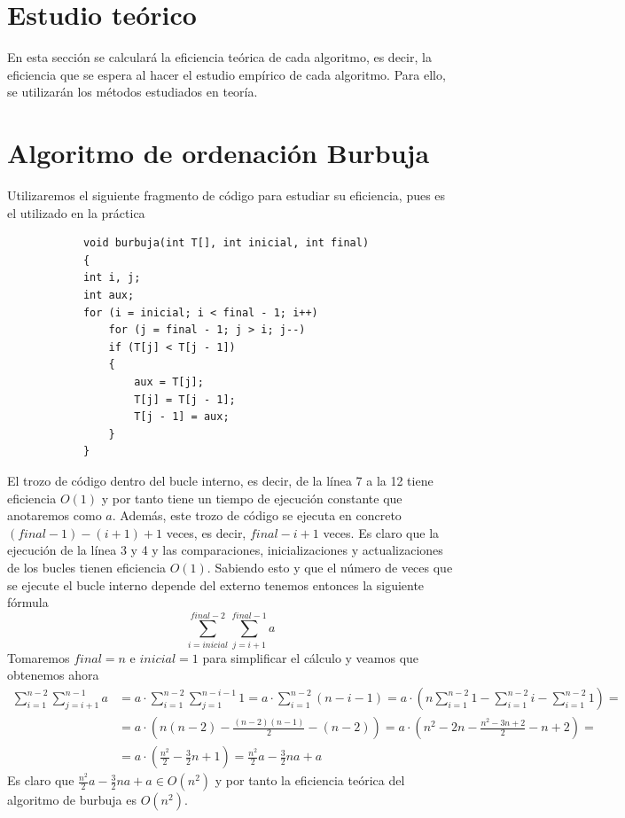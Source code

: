 \documentclass[11pt,openany]{book}
\begin{document}
\section{Estudio teórico}
En esta sección se calculará la eficiencia teórica de cada algoritmo, es decir, la eficiencia que se espera al hacer el
estudio empírico de cada algoritmo. Para ello, se utilizarán los métodos estudiados en teoría.
\section*{Algoritmo de ordenación Burbuja}
Utilizaremos el siguiente fragmento de código para estudiar su eficiencia, pues es el utilizado en la práctica
\begin{lstlisting}
            void burbuja(int T[], int inicial, int final)
            {
            int i, j;
            int aux;
            for (i = inicial; i < final - 1; i++)
                for (j = final - 1; j > i; j--)
                if (T[j] < T[j - 1])
                {
                    aux = T[j];
                    T[j] = T[j - 1];
                    T[j - 1] = aux;
                }
            }
        \end{lstlisting}
El trozo de código dentro del bucle interno, es decir, de la línea 7 a la 12 tiene eficiencia $O(1)$ y por tanto
tiene un tiempo de ejecución constante que anotaremos como $a$. Además, este trozo de código se ejecuta
en concreto $(final-1)-(i+1) +1$ veces, es decir, $final-i+1$ veces. Es claro que la ejecución de la línea 3 y 4
y las comparaciones, inicializaciones y actualizaciones de los bucles tienen eficiencia $O(1)$. Sabiendo esto y que
el número de veces que se ejecute el bucle interno depende del externo tenemos entonces la siguiente fórmula
\begin{equation*}
    \sum_{i=inicial}^{final-2} \sum_{j=i+1}^{final-1}a
\end{equation*}
Tomaremos $final =  n$ e $inicial = 1$ para simplificar el cálculo y veamos que obtenemos ahora
\begin{equation*}\begin{split}
        \sum_{i=1}^{n-2} \sum_{j=i+1}^{n-1}a&= a \cdot \sum_{i=1}^{n-2} \sum_{j=1}^{n-i-1}1
        = a \cdot \sum_{i=1}^{n-2} (n-i-1) =  a \cdot ( n\sum_{i=1}^{n-2} 1 - \sum_{i=1}^{n-2} i - \sum_{i=1}^{n-2} 1)= \\
        &= a \cdot ( n(n-2) - \frac{(n-2)(n-1)}{2} - (n-2))= a \cdot ( n^2-2n - \frac{n^2-3n+2}{2} - n+2)=\\
        &= a \cdot \left(\frac{n^2}{2}-\frac{3}{2}n+1\right)= \frac{n^2}{2}a-\frac{3}{2}na+a
    \end{split}\end{equation*}
Es claro que $\frac{n^2}{2}a-\frac{3}{2}na+a \in O(n^2)$ y por tanto la eficiencia teórica del algoritmo de burbuja es $O(n^2)$.
\end{document}
